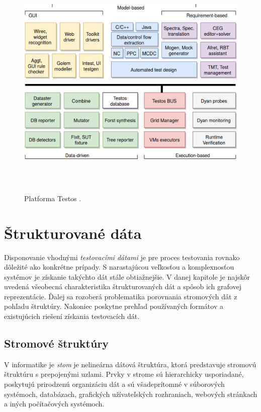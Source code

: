 \begin{figure}[h]\centering
	\centering
	\includegraphics[width=6.0in,height=4.2in]{obrazky-figures/testos.png}\\[1pt]
	\caption{Platforma Testos \cite{Testos}.}
	\label{testos_img}
\end{figure} 


\chapter{Štrukturované dáta} 
\label{struktury}

Disponovanie vhodnými \textit{testovacími dátami} je pre proces testovania rovnako dôležité ako konkrétne prípady. S narastajúcou veľkosťou a komplexnosťou systémov je získanie takýchto dát stále obtiažnejšie. V danej kapitole je najskôr uvedená všeobecná charakteristika štrukturovaných dát a spôsob ich grafovej reprezentácie. Ďalej sa rozoberá problematika  porovnania stromových dát z pohľadu štruktúry. Nakoniec poskytne prehľad používaných formátov a existujúcich riešení získania testovacích dát.


\section{Stromové štruktúry}
V informatike je \textit{stom} je nelineárna dátová štruktúra, ktorá predstavuje stromovú štruktúru s prepojenými uzlami. Prvky v strome sú hierarchicky usporiadané, poskytujú prirodzenú organizáciu dát a sú všadeprítomné v súborových systémoch, databázach, grafických užívateľských rozhraniach, webových stránkach a iných počítačových systémoch. 

